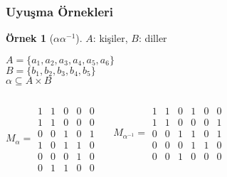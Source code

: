 \documentclass[dvipsnames]{beamer}
\theoremstyle{definition}
\theoremstyle{example}
\newtheorem{ornek}[theorem]{Örnek}
\theoremstyle{plain}
\begin{document}
\begin{frame}
  \frametitle{Uyuşma Örnekleri}

  \begin{ornek}[$\alpha \alpha^{-1}$]
    $A$: kişiler, $B$: diller

    \medskip
    $A=\{a_1,a_2,a_3,a_4,a_5,a_6\}$\\
    $B=\{b_1,b_2,b_3,b_4,b_5\}$\\
    $\alpha \subseteq A \times B$

    \pause
    \begin{columns}
      \[ M_\alpha = \begin{array}{|ccccc|}
          1  &  1  &  0  &  0  &  0\\
          1  &  1  &  0  &  0  &  0\\
          0  &  0  &  1  &  0  &  1\\
          1  &  0  &  1  &  1  &  0\\
          0  &  0  &  0  &  1  &  0\\
          0  &  1  &  1  &  0  &  0
        \end{array} \]

      \[ M_{\alpha^{-1}} = \begin{array}{|cccccc|}
          1  &  1  &  0  &  1  &  0  &  0\\
          1  &  1  &  0  &  0  &  0  &  1\\
          0  &  0  &  1  &  1  &  0  &  1\\
          0  &  0  &  0  &  1  &  1  &  0\\
          0  &  0  &  1  &  0  &  0  &  0
        \end{array} \]
    \end{columns}
  \end{ornek}
\end{frame}
\end{document}
